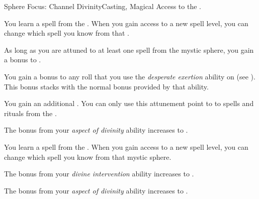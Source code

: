     \begin{feat}{Sphere Focus: Channel Divinity}{Casting, Magical}
        \featpre Access to the  .

         You learn a spell from the  .
        When you gain access to a new spell level, you can change which spell you know from that .

         As long as you are attuned to at least one spell from the  mystic sphere, you gain a  bonus to .

         You gain a  bonus to any roll that you use the \textit{desperate exertion} ability on (see ).
        This bonus stacks with the normal  bonus provided by that ability.

         You gain an additional .
        You can only use this attunement point to  to spells and rituals from the  .

         The bonus from your \textit{aspect of divinity} ability increases to .

         You learn a spell from the  .
        When you gain access to a new spell level, you can change which spell you know from that mystic sphere.

         The bonus from your \textit{divine intervention} ability increases to .

         The bonus from your \textit{aspect of divinity} ability increases to .
    \end{feat}

